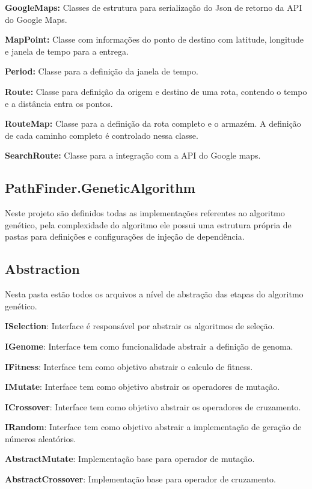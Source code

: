 \textbf{GoogleMaps:} Classes de estrutura para serialização do Json de retorno da API do Google Maps.

\textbf{MapPoint:} Classe com informações do ponto de destino com latitude, longitude e janela de tempo para a entrega.

\textbf{Period:} Classe para a definição da janela de tempo.

\textbf{Route:} Classe para definição da origem e destino de uma rota, contendo o tempo e a distância entra os pontos.

\textbf{RouteMap:} Classe para a definição da rota completo e o armazém. A definição de cada caminho completo é controlado nessa classe. 

\textbf{SearchRoute:} Classe para a integração com a API do Google maps.

\subsection{PathFinder.GeneticAlgorithm}
Neste projeto são definidos todas as implementações referentes ao algoritmo genético, pela complexidade do algoritmo ele possui uma estrutura própria de pastas para definições e configurações de injeção de dependência.

\subsection{Abstraction}

Nesta pasta estão todos os arquivos a nível de abstração das etapas do algoritmo genético.

\textbf{ISelection}: Interface é responsável por abstrair os algoritmos de seleção.

\textbf{IGenome}: Interface tem como funcionalidade abstrair a definição de genoma.

\textbf{IFitness}: Interface tem como objetivo abstrair o calculo de fitness.

\textbf{IMutate}: Interface tem como objetivo abstrair os operadores de mutação.

\textbf{ICrossover}:  Interface tem como objetivo abstrair os operadores de cruzamento.

\textbf{IRandom}: Interface tem como objetivo abstrair a implementação de geração de números aleatórios.

\textbf{AbstractMutate}: Implementação base para operador de mutação.

\textbf{AbstractCrossover}: Implementação base para operador de cruzamento.


